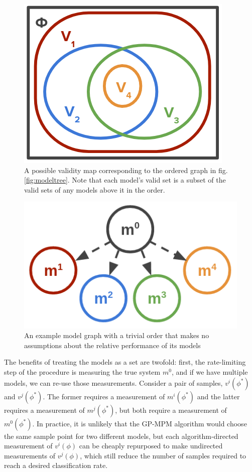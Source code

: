 \documentclass[12pt, conference]{IEEEtran}
\begin{document}
\begin{figure}[htbp]
    \centerline{\includegraphics[width=0.9\columnwidth]{img/v_map.png}}
    \caption{A possible validity map corresponding to the ordered graph in fig. \ref{fig:modeltree}. Note that each model's valid set is a subset of the valid sets of any models above it in the order.}
    \label{fig:vmap}
\end{figure}

\begin{figure}[htbp]
    \centerline{\includegraphics[width=0.9\columnwidth]{img/model_tree_unordered.png}}
    \caption{An example model graph with a trivial order that makes no assumptions about the relative performance of its models
    }
    \label{fig:modeltree2}
\end{figure}

The benefits of treating the models as a set are twofold: first, the rate-limiting step of the procedure is measuring the true system $m^0$, and if we have multiple models, we can re-use those measurements. Consider a pair of samples, $v^i(\phi^*)$ and $v^j(\phi^*)$. The former requires a measurement of $m^i(\phi^*)$ and the latter requires a measurement of $m^j(\phi^*)$, but both require a measurement of $m^0(\phi^*)$. In practice, it is unlikely that the GP-MPM algorithm would choose the same sample point for two different models, but each algorithm-directed measurement of $v^i(\phi)$ can be cheaply repurposed to make undirected measurements of $v^j(\phi)$, which still reduce the number of samples required to reach a desired classification rate.
\end{document}
